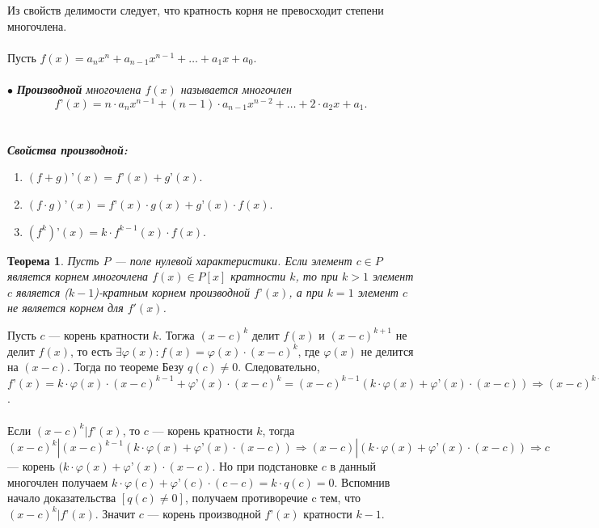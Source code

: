 Из свойств делимости следует, что кратность корня не превосходит степени многочлена.\\\\
Пусть $f(x) = a_nx^n + a_{n-1}x^{n-1} + \ldots + a_1x + a_0$.\\\\
$\bullet$ \textit{\textbf{Производной} многочлена $f(x)$ называется многочлен $$f’(x) = n \cdot a_nx^{n-1} + (n - 1) \cdot a_{n-1}x^{n-2} + \ldots + 2 \cdot a_2x+ a_1.$$}\\\\
\textit{\textbf{Свойства производной:}}
\begin{enumerate}
	\item $(f + g)’(x) = f ’(x) + g’(x).$
	\item $(f \cdot g)’(x) = f’(x) \cdot g(x) + g’(x) \cdot f(x).$
	\item $(f^k)’(x) = k \cdot f^{k-1}(x) \cdot f(x).
	$
\end{enumerate}
\newtheorem*{863}{Теорема}\begin{863}
	Пусть $P$ --- поле нулевой характеристики. Если элемент $c \in P$ является корнем многочлена $f(x) \in P[x]$ кратности $k$, то 
	при $k > 1$ элемент $c$ является ($k-1$)-кратным корнем производной $f’(x)$, а при $k = 1$ элемент $c$ не является корнем для $f'(x)$.
\end{863}
\begin{Proof}
	Пусть $c$ --- корень кратности $k$. Тогжа $(x - c)^k$ делит $f(x)$ и $(x - c)^{k+1}$ не делит $f(x)$, то есть $\exists \varphi(x) : f(x) = \varphi(x)\cdot (x - c)^k$, где $\varphi(x)$ не 
	делится на $(x - c)$. Тогда по теореме Безу $q(c) \not= 0$. Следовательно, $f’(x) = k\cdot \varphi(x)\cdot (x - c)^{k-1} + \varphi’(x)\cdot (x - c)^k = (x - c)^{k-1}(k\cdot \varphi(x) + 
	\varphi’(x)\cdot (x - c)) \Rightarrow (x - c)^{k-1}|f’(x)$. \\\\
	Если $(x - c)^k
	|f’(x)$, то $c$ --- корень кратности $k$, тогда $(x - c)^k|(x - c)^{k-1}(k\cdot \varphi(x) + \varphi’(x)\cdot (x - c)) \Rightarrow (x - c)|(k\cdot \varphi(x) + \varphi’(x)\cdot (x - c))\Rightarrow c$ --- корень $(k\cdot \varphi(x) + \varphi’(x)\cdot (x - c)$. Но при подстановке $c$ в данный 
	многочлен получаем $k\cdot\varphi(c) + \varphi’(c)\cdot(c - c) = k\cdot q(c) = 0$. Вспомнив начало доказательства $[q(c) \not= 0]$, получаем противоречие c тем, что $(x - c)^k|f’(x)$. Значит $c$ --- корень производной $f’(x)$ кратности $k-1$. 
\end{Proof}


